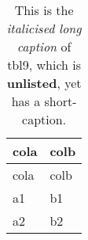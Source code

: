\documentclass[
]{article}
\begin{document}
\def\pandoctableshortcapt{}  %

\hypertarget{tbl:tbl-label9}{}
\begin{longtable}[]{@{}ll@{}}
\caption{\label{tbl:tbl-label9}This is the \emph{italicised long
caption} of tbl9, which is \textbf{unlisted}, yet has a
short-caption.}\tabularnewline
\toprule
cola & colb\tabularnewline
\midrule
\endfirsthead
\toprule
cola & colb\tabularnewline
\midrule
\endhead
a1 & b1\tabularnewline
a2 & b2\tabularnewline
\bottomrule
\end{longtable}

\undef\pandoctableshortcapt
\end{document}
